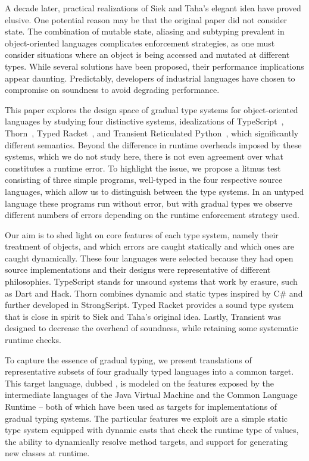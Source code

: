\documentclass[acmsmall, anonymous, authordraft, review]{acmart} %
\begin{document}
A decade later, practical realizations of Siek and Taha's elegant idea have
proved elusive. One potential reason may be that the original paper did not
consider state. The combination of mutable state, aliasing and subtyping
prevalent in object-oriented languages complicates enforcement strategies,
as one must consider situations where an object is being accessed and
mutated at different types. While several solutions have been proposed,
their performance implications appear daunting. Predictably, developers of
industrial languages have chosen to compromise on soundness to avoid
degrading performance.

This paper explores the design space of gradual type systems for
object-oriented languages by studying four distinctive systems,
idealizations of TypeScript~\cite{BAT14}, Thorn~\cite{oopsla09}, Typed
Racket~\cite{tf-popl08}, and Transient Reticulated Python~\cite{siek14},
which significantly different semantics.  Beyond the difference in runtime
overheads imposed by these systems, which we do not study here, there is not
even agreement over what constitutes a runtime error.  To highlight the
issue, we propose a litmus test consisting of three simple programs,
well-typed in the four respective source languages, which allow us to
distinguish between the type systems. In an untyped language these programs
run without error, but with gradual types we observe different numbers of
errors depending on the runtime enforcement strategy used.

Our aim is to shed light on core features of each type system, namely their
treatment of objects, and which errors are caught statically and which ones
are caught dynamically.  These four languages were selected because they had
open source implementations and their designs were representative of
different philosophies.  TypeScript stands for unsound systems that work by
erasure, such as Dart and Hack.  Thorn combines dynamic and static types
inspired by C\# and further developed in StrongScript. Typed Racket provides
a sound type system that is close in spirit to Siek and Taha's original
idea. Lastly, Transient was designed to decrease the overhead of soundness,
while retaining some systematic runtime checks.

To capture the essence of gradual typing, we present translations of
representative subsets of four gradually typed languages into a common
target. This target language, dubbed \kafka, is modeled on the features
exposed by the intermediate languages of the Java Virtual Machine and the
Common Language Runtime -- both of which have been used as targets for
implementations of gradual typing systems.  The particular features we
exploit are a simple static type system equipped with dynamic casts that
check the runtime type of values, the ability to dynamically resolve method
targets, and support for generating new classes at runtime.
\end{document}
